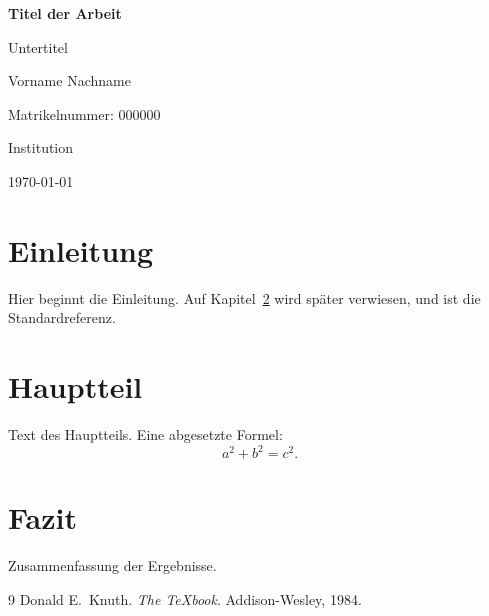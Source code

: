 \documentclass[12pt,a4paper]{report}
\begin{document}
\begin{titlepage}
    \centering
    \vspace*{2cm}
    {\Huge\bfseries Titel der Arbeit\par}
    \vspace{1cm}
    {\Large Untertitel\par}
    \vspace{2cm}
    {\large Vorname Nachname\par}
    \vspace{0.5cm}
    {\large Matrikelnummer: 000000\par}
    \vfill
    {\large Institution\par}
    {\large \today\par}
\end{titlepage}

\tableofcontents

\chapter{Einleitung}
\label{cha:einleitung}
Hier beginnt die Einleitung. Auf Kapitel~\ref{cha:hauptteil} wird später
verwiesen, und \cite{knuth1984} ist die Standardreferenz.

\chapter{Hauptteil}
\label{cha:hauptteil}
Text des Hauptteils. Eine abgesetzte Formel:
\[
    a^2 + b^2 = c^2 .
\]

\chapter{Fazit}
Zusammenfassung der Ergebnisse.

\begin{thebibliography}{9}
    Donald E.~Knuth. \emph{The \TeX book}. Addison-Wesley, 1984.
\end{thebibliography}
\end{document}
